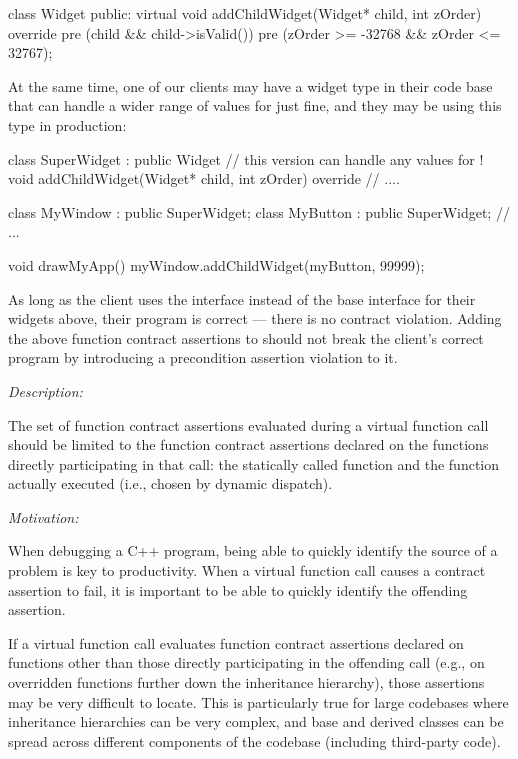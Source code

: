 \begin{codeblock}
class Widget {
public:
  virtual void addChildWidget(Widget* child, int zOrder) override
    pre (child && child->isValid())
    pre (zOrder >= -32768 && zOrder <= 32767);
}
\end{codeblock}

At the same time, one of our clients may have a widget type in their code base that can handle a wider range of values for  just fine, and they may be using this type in production:

\begin{codeblock}
class SuperWidget : public Widget {
  // this version can handle any values for !
  void addChildWidget(Widget* child, int zOrder) override {
    // ....
  } 
}

class MyWindow : public SuperWidget;
class MyButton : public SuperWidget;
// ...

void drawMyApp() {
  myWindow.addChildWidget(myButton, 99999);
}
\end{codeblock}
As long as the client uses the  interface instead of the base  interface for their widgets above, their program is correct --- there is no contract violation. Adding the above function contract assertions to \allowbreak{} should not break the client's correct program by introducing a precondition assertion violation to it.



\emph{Description:}

The set of function contract assertions evaluated during a virtual function call should be limited to the function contract assertions declared on the functions directly participating in that call: the statically called
function and the function actually executed (i.e., chosen by dynamic dispatch). 

\emph{Motivation:}

When debugging a C++ program, being able to quickly identify the source of a problem is key to productivity. When a virtual function call causes a contract assertion to fail, it is important to be able to quickly identify the offending assertion.

If a virtual function call evaluates function contract assertions declared on functions other than those directly participating in the offending call (e.g., on overridden functions further down the inheritance hierarchy), those assertions may be very difficult to locate. This is particularly true for large codebases where inheritance hierarchies can be very complex, and base and derived classes can be spread across different components of the codebase (including third-party code).


